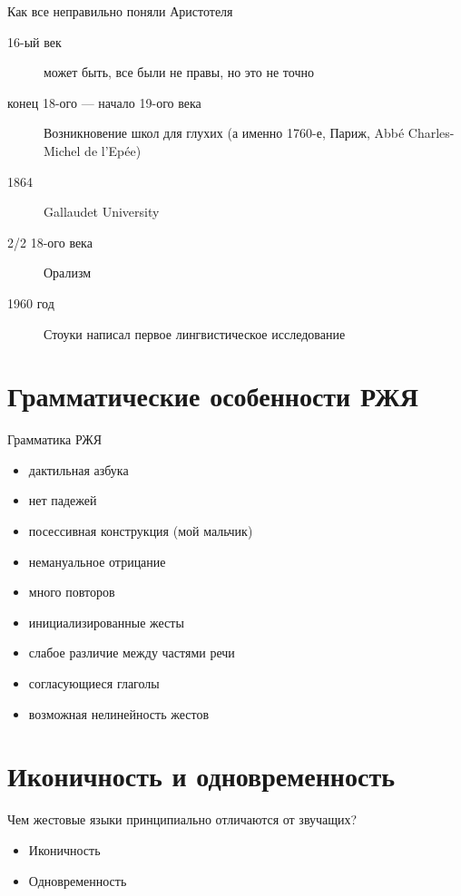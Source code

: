 \documentclass[13pt, t]{beamer}
\begin{document}
\begin{frame}{Как все неправильно поняли Аристотеля}
    \begin{description}
        \item[16-ый век] может быть, все были не правы, но это не точно
        \item[конец 18-ого --- начало 19-ого века] Возникновение школ для глухих (а именно 1760-е, Париж, Abbé Charles-Michel de l’Epée)
        \item[1864] Gallaudet University \pause
        \item[2/2 18-ого века] Орализм
        \item[1960 год] Стоуки написал первое лингвистическое исследование
    \end{description}
\end{frame}

\section{Грамматические особенности РЖЯ} %
\begin{frame}{Грамматика РЖЯ}
\begin{itemize}
    \item дактильная азбука
    \item нет падежей
    \item посессивная конструкция (мой мальчик)
    \item немануальное отрицание
    \item много повторов
    \item инициализированные жесты
    \item слабое различие между частями речи
    \item согласующиеся глаголы
    \item возможная нелинейность жестов
\end{itemize}
\end{frame}

\section{Иконичность и одновременность} %
\begin{frame}{Чем жестовые языки принципиально отличаются от звучащих?}
\begin{itemize}
    \item Иконичность
    \item Одновременность
\end{itemize}
\end{frame}
\end{document}
